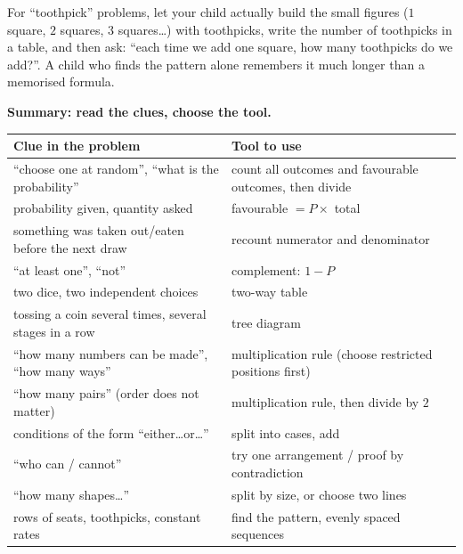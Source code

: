\documentclass[11pt]{article}
\begin{document}
\begin{parentbox}
For ``toothpick'' problems, let your child actually build the small figures ($1$ square, $2$ squares, $3$ squares\ldots) with toothpicks, write the number of toothpicks in a table, and then ask: ``each time we add one square, how many toothpicks do we add?''. A child who finds the pattern alone remembers it much longer than a memorised formula.
\end{parentbox}

\begin{knowbox}
\textbf{Summary: read the clues, choose the tool.}\par\smallskip
\begin{tabularx}{\linewidth}{@{}>{\raggedright\arraybackslash}X>{\raggedright\arraybackslash}X@{}}
\textbf{Clue in the problem} & \textbf{Tool to use}\\ \hline
``choose one at random'', ``what is the probability'' & count all outcomes and favourable outcomes, then divide\\
probability given, quantity asked & favourable $=P\times$ total\\
something was taken out/eaten before the next draw & recount numerator and denominator\\
``at least one'', ``not'' & complement: $1-P$\\
two dice, two independent choices & two-way table\\
tossing a coin several times, several stages in a row & tree diagram\\
``how many numbers can be made'', ``how many ways'' & multiplication rule (choose restricted positions first)\\
``how many pairs'' (order does not matter) & multiplication rule, then divide by $2$\\
conditions of the form ``either\ldots or\ldots'' & split into cases, add\\
``who can / cannot'' & try one arrangement / proof by contradiction\\
``how many shapes\ldots'' & split by size, or choose two lines\\
rows of seats, toothpicks, constant rates & find the pattern, evenly spaced sequences\\
\end{tabularx}
\end{knowbox}
\end{document}
